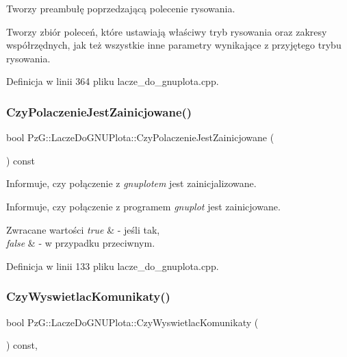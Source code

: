 Tworzy preambułę poprzedzającą polecenie rysowania. 

Tworzy zbiór poleceń, które ustawiają właściwy tryb rysowania oraz zakresy współrzędnych, jak też wszystkie inne parametry wynikające z przyjętego trybu rysowania. 

Definicja w linii 364 pliku lacze\+\_\+do\+\_\+gnuplota.\+cpp.

\mbox{\label{class_pz_g_1_1_lacze_do_g_n_u_plota_af8be8aeb3b1b524fab67d4411cba5b9e}} 
\subsubsection{\texorpdfstring{Czy\+Polaczenie\+Jest\+Zainicjowane()}{CzyPolaczenieJestZainicjowane()}}
{\footnotesize\ttfamily bool Pz\+G\+::\+Lacze\+Do\+G\+N\+U\+Plota\+::\+Czy\+Polaczenie\+Jest\+Zainicjowane (\begin{DoxyParamCaption}{ }\end{DoxyParamCaption}) const}



Informuje, czy połączenie z {\itshape gnuplot\textquotesingle{}em} jest zainicjalizowane. 

Informuje, czy połączenie z programem {\itshape gnuplot} jest zainicjowane. 
\begin{DoxyRetVals}{Zwracane wartości}
{\em true} & -\/ jeśli tak, \\
\hline
{\em false} & -\/ w przypadku przeciwnym. \\
\hline
\end{DoxyRetVals}


Definicja w linii 133 pliku lacze\+\_\+do\+\_\+gnuplota.\+cpp.

\mbox{\label{class_pz_g_1_1_lacze_do_g_n_u_plota_a5e4f3a226ed36f7110032d802d84847c}} 
\subsubsection{\texorpdfstring{Czy\+Wyswietlac\+Komunikaty()}{CzyWyswietlacKomunikaty()}}
{\footnotesize\ttfamily bool Pz\+G\+::\+Lacze\+Do\+G\+N\+U\+Plota\+::\+Czy\+Wyswietlac\+Komunikaty (\begin{DoxyParamCaption}{ }\end{DoxyParamCaption}) const\hspace{0.3cm}{\ttfamily [inline]}, {\ttfamily [protected]}}



